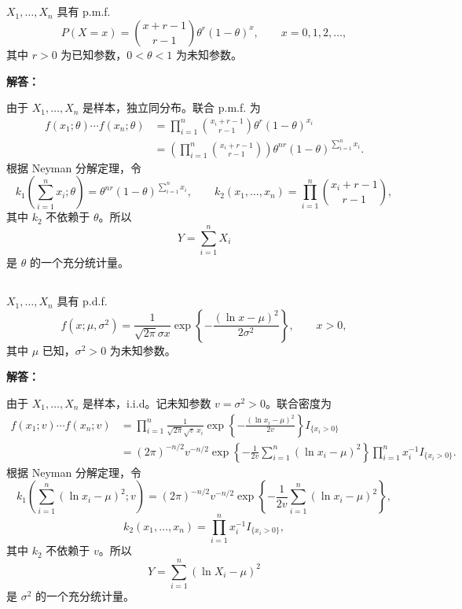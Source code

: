 \documentclass[12pt,a4paper]{article}
\begin{document}
\subsection{}

  $X_1,\ldots,X_n$ 具有 p.m.f.
  \[
  P(X=x)=\binom{x+r-1}{r-1}\theta^r(1-\theta)^x,\qquad x=0,1,2,\ldots,
  \]
  其中 $r>0$ 为已知参数，$0<\theta<1$ 为未知参数。

\begin{answerbox}
\textbf{解答：}

由于 $X_1,\ldots,X_n$ 是样本，独立同分布。联合 p.m.f. 为
\[
\begin{aligned}
f(x_1;\theta)\cdots f(x_n;\theta)
&=\prod_{i=1}^n\binom{x_i+r-1}{r-1}\theta^r(1-\theta)^{x_i}\\
&=\left(\prod_{i=1}^n\binom{x_i+r-1}{r-1}\right)\theta^{nr}(1-\theta)^{\sum_{i=1}^n x_i}.
\end{aligned}
\]
根据 Neyman 分解定理，令
\[
k_1\left(\sum_{i=1}^n x_i;\theta\right)
=\theta^{nr}(1-\theta)^{\sum_{i=1}^n x_i},
\qquad
k_2(x_1,\ldots,x_n)=\prod_{i=1}^n\binom{x_i+r-1}{r-1},
\]
其中 $k_2$ 不依赖于 $\theta$。所以
\[
Y=\sum_{i=1}^n X_i
\]
是 $\theta$ 的一个充分统计量。
\end{answerbox}

\subsection{}

   $X_1,\ldots,X_n$ 具有 p.d.f.
  \[
  f(x;\mu,\sigma^2)=\frac{1}{\sqrt{2\pi}\sigma x}
  \exp\left\{-\frac{(\ln x-\mu)^2}{2\sigma^2}\right\},\qquad x>0,
  \]
  其中 $\mu$ 已知，$\sigma^2>0$ 为未知参数。

\begin{answerbox}
\textbf{解答：}

由于 $X_1,\ldots,X_n$ 是样本，i.i.d。记未知参数 $v=\sigma^2>0$。联合密度为
\[
\begin{aligned}
f(x_1;v)\cdots f(x_n;v)
&=\prod_{i=1}^n\frac{1}{\sqrt{2\pi}\sqrt v\,x_i}
\exp\left\{-\frac{(\ln x_i-\mu)^2}{2v}\right\}I_{\{x_i>0\}}\\
&=(2\pi)^{-n/2}v^{-n/2}
\exp\left\{-\frac{1}{2v}\sum_{i=1}^n(\ln x_i-\mu)^2\right\}
\prod_{i=1}^n x_i^{-1}I_{\{x_i>0\}}.
\end{aligned}
\]
根据 Neyman 分解定理，令
\[
k_1\left(\sum_{i=1}^n(\ln x_i-\mu)^2;v\right)
=(2\pi)^{-n/2}v^{-n/2}
\exp\left\{-\frac{1}{2v}\sum_{i=1}^n(\ln x_i-\mu)^2\right\},
\]
\[
k_2(x_1,\ldots,x_n)=\prod_{i=1}^n x_i^{-1}I_{\{x_i>0\}},
\]
其中 $k_2$ 不依赖于 $v$。所以
\[
Y=\sum_{i=1}^n(\ln X_i-\mu)^2
\]
是 $\sigma^2$ 的一个充分统计量。
\end{answerbox}
\end{document}
